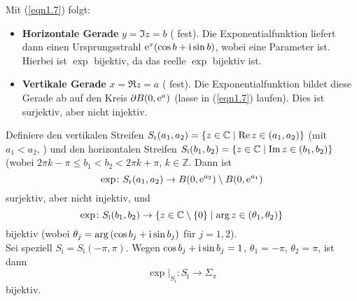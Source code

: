 \documentclass[a4paper,twoside,DIV15,BCOR12mm]{scrbook}
\begin{document}
Mit (\ref{eqn1.7}) folgt:

\begin{itemize}
\item {\bf Horizontale Gerade} $y=\Im{z}=b$ ( fest). Die Exponentialfunktion liefert dann einen Ursprungsstrahl
  $\mathrm{e}^x(\cos{b}+\mathrm{i}\sin{b})$, wobei  eine Parameter ist. Hierbei ist $\exp$ bijektiv, da das reelle $\exp$ bijektiv
  ist.
\item {\bf Vertikale Gerade} $x=\Re{z}=a$ ( fest). Die Exponentialfunktion bildet diese Gerade ab auf den Kreis
  $\partial B(0,\mathrm{e}^a)$ (lasse in (\ref{eqn1.7})  laufen). Dies ist surjektiv, aber nicht injektiv.
\end{itemize}

\noindent Definiere den vertikalen Streifen $S_\text{r}(a_1,a_2) = \{z\in\mathbb{C} \mid \operatorname{Re}{z}\in(a_1,a_2)\}$ (mit $a_1<a_2$,
) und den horizontalen Streifen $S_\text{i}(b_1,b_2) = \{z\in\mathbb{C} \mid \operatorname{Im}{z}\in(b_1,b_2)\}$ (wobei $2\pi k-\pi
\leq b_1<b_2 < 2\pi k + \pi$, $k\in\mathbb{Z}$. Dann ist
\[\exp\colon S_\text{r}(a_1,a_2) \to B(0,\mathrm{e}^{a_2})\setminus B(0,\mathrm{e}^{a_1})\]
surjektiv, aber nicht injektiv, und
\[\exp\colon S_\text{i}(b_1,b_2) \to \{z\in\mathbb{C}\setminus\{0\} \mid \arg{z}\in(\theta_1,\theta_2)\}\]
bijektiv (wobei $\theta_j = \arg{(\cos{b_j}+\mathrm{i}\sin{b_j})}$ für $j=1,2$).\\
Sei speziell $S_\text{i}=S_\text{i}(-\pi,\pi)$. Wegen $\cos{b_j}+\mathrm{i}\sin{b_j}=1$, $\theta_1=-\pi$, $\theta_2=\pi$, ist dann
\[\exp|_{S_\text{i}}\colon S_\text{i} \to \Sigma_\pi\] bijektiv.
\end{document}
